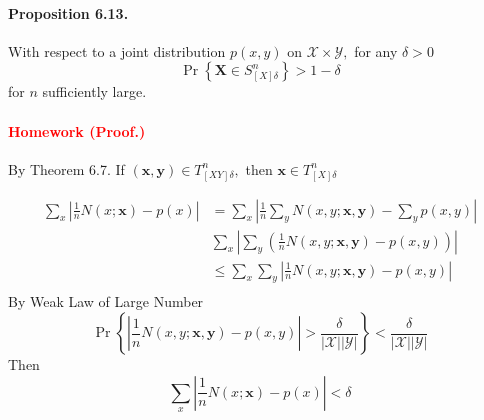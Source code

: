 \documentclass[8pt]{article}
\begin{document}
\begin{tcolorbox}
\paragraph{Proposition 6.13.} With respect to a joint distribution $p(x, y)$ on $\mathcal{X} \times \mathcal{Y},$ for any $\delta>0$
$$
\operatorname{Pr}\left\{\mathbf{X} \in S_{[X] \delta}^{n}\right\}>1-\delta
$$
for $n$ sufficiently large.
\end{tcolorbox}

\paragraph{\textcolor{red}{Homework (Proof.)}}
By Theorem 6.7. If $(\mathbf{x}, \mathbf{y}) \in T_{[X Y] \delta}^{n},$ then $\mathbf{x} \in T_{[X] \delta}^{n}$

$$
\begin{aligned}
	\sum_{x}\left|\frac{1}{n} N(x ; \mathbf{x})-p(x)\right|
	&=\sum_{x}\left|\frac{1}{n} \sum_{y} N(x, y ; \mathbf{x}, \mathbf{y})-\sum_{y} p(x, y)\right| \\
	&\sum_{x}\left|\sum_{y}\left(\frac{1}{n} N(x, y ; \mathbf{x}, \mathbf{y})-p(x, y)\right)\right| \\
	&\leq \sum_{x} \sum_{y} \left|\frac{1}{n} N(x, y ; \mathbf{x}, \mathbf{y})-p(x, y)\right| \\
\end{aligned}
$$
By Weak Law of Large Number
$$
\operatorname{Pr}\left\{  \left|\frac{1}{n} N(x, y ; \mathbf{x}, \mathbf{y})-p(x, y)\right| >\frac{\delta}{|\mathcal{X}| |\mathcal{Y}|}\right\}<\frac{\delta}{|\mathcal{X}| |\mathcal{Y}|}
$$
Then 
$$
\sum_{x}\left|\frac{1}{n} N(x ; \mathbf{x})-p(x)\right| < \delta
$$
\end{document}
